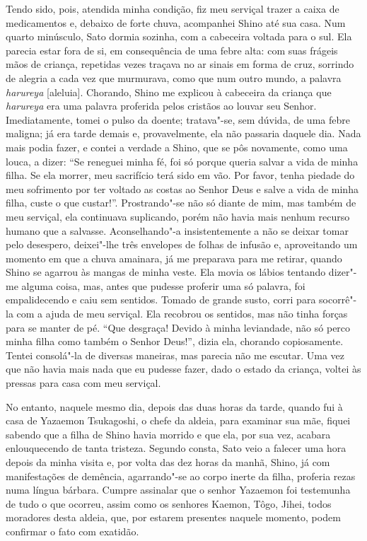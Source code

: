 Tendo sido, pois, atendida minha condição, fiz meu serviçal trazer a
caixa de medicamentos e, debaixo de forte chuva, acompanhei Shino até
sua casa. Num quarto minúsculo, Sato dormia sozinha, com a cabeceira
voltada para o sul. Ela parecia estar fora de si, em consequência de
uma febre alta: com suas frágeis mãos de criança, repetidas vezes
traçava no ar sinais em forma de cruz, sorrindo de alegria a cada vez
que murmurava, como que num outro mundo, a palavra
\textit{harureya} [aleluia]. Chorando, Shino me
explicou à cabeceira da criança que \textit{harureya} era uma palavra
proferida pelos cristãos ao louvar seu Senhor. Imediatamente, tomei o
pulso da doente; tratava"-se, sem dúvida, de uma febre maligna; já era
tarde demais e, provavelmente, ela não passaria daquele dia. Nada mais
podia fazer, e contei a verdade a Shino, que se pôs novamente, como uma
louca, a dizer: ``Se reneguei minha fé, foi só porque queria salvar a
vida de minha filha. Se ela morrer, meu sacrifício terá sido em vão.
Por favor, tenha piedade do meu sofrimento por ter voltado as costas ao
Senhor Deus e salve a vida de minha filha, custe o que custar!''. 
Prostrando"-se não só diante de mim, mas também de meu serviçal, ela
continuava suplicando, porém não havia mais nenhum recurso humano que a
salvasse. Aconselhando"-a insistentemente a não se deixar tomar pelo
desespero, deixei"-lhe três envelopes de folhas de infusão e,
aproveitando um momento em que a chuva amainara, já me preparava para
me retirar, quando Shino se agarrou às mangas de minha veste. Ela movia
os lábios tentando dizer"-me alguma coisa, mas, antes que pudesse
proferir uma só palavra, foi empalidecendo e caiu sem sentidos. Tomado
de grande susto, corri para socorrê"-la com a ajuda de meu serviçal. Ela
recobrou os sentidos, mas não tinha forças para se manter de pé. ``Que
desgraça! Devido à minha leviandade, não só perco minha filha como
também o Senhor Deus!'', dizia ela, chorando copiosamente. Tentei
consolá"-la de diversas maneiras, mas parecia não me escutar. Uma vez
que não havia mais nada que eu pudesse fazer, dado o estado da criança,
voltei às pressas para casa com meu serviçal.

No entanto, naquele mesmo dia, depois das duas horas da tarde, quando
fui à casa de Yazaemon Tsukagoshi, o chefe da aldeia, para examinar sua
mãe, fiquei sabendo que a filha de Shino havia morrido e que ela, por
sua vez, acabara enlouquecendo de tanta tristeza. Segundo consta, Sato
veio a falecer uma hora depois da minha visita e, por volta das dez
horas da manhã, Shino, já com manifestações de demência, agarrando"-se
ao corpo inerte da filha, proferia rezas numa língua bárbara. Cumpre
assinalar que o senhor Yazaemon foi testemunha de tudo o que ocorreu,
assim como os senhores Kaemon, Tôgo, Jihei, todos moradores desta
aldeia, que, por estarem presentes naquele momento, podem confirmar o
fato com exatidão.

